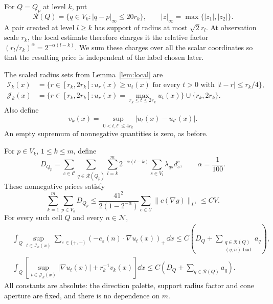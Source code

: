 For $Q=Q_p$ at level $k$, put
\[
 \mathcal R(Q)=\{q\in V_k:|q-p|_\infty\le20r_k\},
 \qquad |z|_\infty=\max\{|z_1|,|z_2|\}.
\]
A pair created at level $l\ge k$ has support of radius at most
$\sqrt2r_l$. At observation scale $r_k$, the local estimate
therefore charges it the relative factor
$(r_l/r_k)^\alpha=2^{-\alpha(l-k)}$. We sum these charges over
all the scalar coordinates so that the resulting price is
independent of the label chosen later.

The scaled radius sets from Lemma~\ref{lem:local} are
\begin{align*}
 \mathcal I_k(x)
   &=\{r\in[r_k,2r_k]:u_r(x)\ge u_t(x)
             \text{ for every }t>0\text{ with }|t-r|\le r_k/4\},\\
 \mathcal J_k(x)
   &=\{r\in[r_k,2r_k]:u_r(x)=\max_{r_k\le t\le2r_k}u_t(x)\}
       \cup\{r_k,2r_k\}.
\end{align*}
Also define
\[
 v_k(x)=\sup_{0<t,t'\le4r_k}|u_t(x)-u_{t'}(x)|.
\]
An empty supremum of nonnegative quantities is zero, as before.

\begin{proposition}
\label{prop:prices}
For $p\in V_k$, $1\le k\le m$, define
\begin{equation}
 D_{Q_p}=\sum_{c\in\mathcal C}
       \sum_{q\in\mathcal R(Q_p)}
       \sum_{l=k}^m2^{-\alpha(l-k)}
       \sum_{s\in V_l}\lambda_{qs}d_s^c,
 \qquad \alpha=\frac1{100}.
 \label{eq:prices-definition}
\end{equation}
These nonnegative prices satisfy
\begin{equation}
 \sum_{k=1}^m\sum_{p\in V_k}D_{Q_p}
 \le\frac{41^2}{2(1-2^{-\alpha})}
           \sum_{c\in\mathcal C}\|c(\nabla g)\|_{L^1}
 \le C V.
 \label{eq:price-budget}
\end{equation}
For every such cell $Q$ and every $n\in\mathcal N$,
\begin{equation}
\begin{aligned}
 &\int_Q\sup_{t\in\mathcal I_k(x)}
       \sum_{\varepsilon\in\{+,-\}}
       (-e_\varepsilon(n)\cdot\nabla u_t(x))_+\,\dd x
   \le C\left(D_Q+
       \sum_{\substack{q\in\mathcal R(Q)\\(q,n)\text{ bad}}}a_q\right),
 \\
 &\int_Q\left[\sup_{t\in\mathcal J_k(x)}|\nabla u_t(x)|
                  +r_k^{-1}v_k(x)\right]\dd x
   \le C\left(D_Q+\sum_{q\in\mathcal R(Q)}a_q\right).
\end{aligned}
\label{eq:prices}
\end{equation}
All constants are absolute: the direction palette, support radius
factor and cone aperture are fixed, and there is no dependence
on $m$.
\end{proposition}

